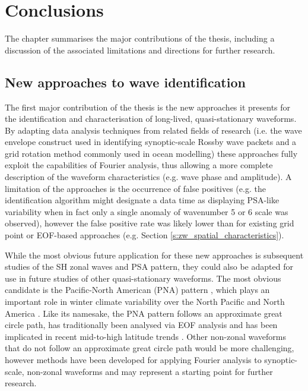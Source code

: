 
\chapter{Conclusions}


\begin{synopsis}

The chapter summarises the major contributions of the thesis, including a discussion of the associated limitations and directions for further research.

\end{synopsis}


\section{New approaches to wave identification}

The first major contribution of the thesis is the new approaches it presents for the identification and characterisation of long-lived, quasi-stationary waveforms. By adapting data analysis techniques from related fields of research (i.e. the wave envelope construct used in identifying synoptic-scale Rossby wave packets and a grid rotation method commonly used in ocean modelling) these approaches fully exploit the capabilities of Fourier analysis, thus allowing a more complete description of the waveform characteristics (e.g. wave phase and amplitude). A limitation of the approaches is the occurrence of false positives (e.g. the identification algorithm might designate a data time as displaying PSA-like variability when in fact only a single anomaly of wavenumber 5 or 6 scale was observed), however the false positive rate was likely lower than for existing grid point or EOF-based approaches (e.g. Section \ref{s:zw_spatial_characteristics}).

While the most obvious future application for these new approaches is subsequent studies of the SH zonal waves and PSA pattern, they could also be adapted for use in future studies of other quasi-stationary waveforms. The most obvious candidate is the Pacific-North American (PNA) pattern \citep{Wallace1981}, which plays an important role in winter climate variability over the North Pacific and North America \citep[e.g.][]{Notaro2006}. Like its namesake, the PNA pattern follows an approximate great circle path, has traditionally been analysed via EOF analysis and has been implicated in recent mid-to-high latitude trends \citep[e.g.][]{Ding2014,Liu2015}. Other non-zonal waveforms that do not follow an approximate great circle path would be more challenging, however methods have been developed for applying Fourier analysis to synoptic-scale, non-zonal waveforms \citep{Zimin2006,Souders2014} and may represent a starting point for further research. 

